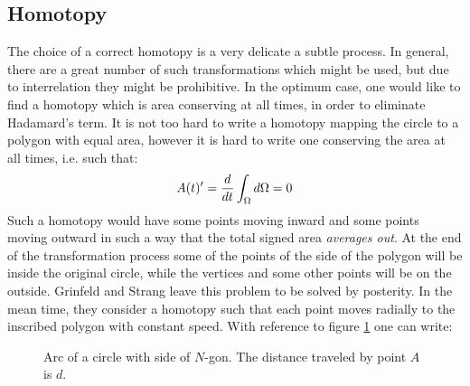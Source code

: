 \documentclass[../main.tex]{subfiles}
\begin{document}
		\subsection{Homotopy}
		The choice of a correct homotopy is a very delicate a subtle process. In general, there are a great number of such transformations which might be used, but due to interrelation they might be prohibitive. In the optimum case, one would like to find a homotopy which is area conserving at all times, in order to eliminate Hadamard's term. It is not too hard to write a homotopy mapping the circle to a polygon with equal area, however it is hard to write one conserving the area at all times, i.e. such that:
		\begin{gather}
			A(t)'=\dfrac{d}{dt}\int_{\Omega}d\Omega=0
		\end{gather}
		Such a homotopy would have some points moving inward and some points moving outward in such a way that the total signed area \emph{averages out}. At the end of the transformation process some of the points of the side of the polygon will be inside the original circle, while the vertices and some other points will be on the outside.
		Grinfeld and Strang leave this problem to be solved by posterity. In the mean time, they consider a homotopy such that each point moves radially to the inscribed polygon with constant speed. With reference to figure \ref{fig:hom} one can write: 
		\begin{figure}
			\centering
			
			\caption{Arc of a circle with side of $ N $-gon. The distance traveled by point $ A$ is $ d $.}\label{fig:hom}
		\end{figure}
		
\end{document}
